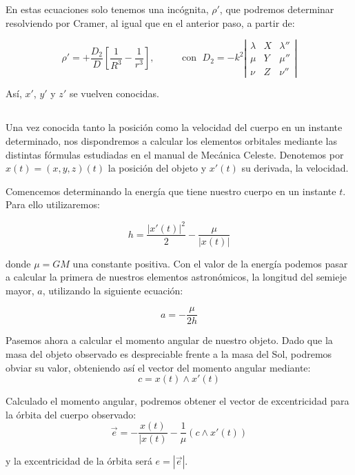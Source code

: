 \documentclass[11pt]{article}
\begin{document}
En estas ecuaciones solo tenemos una incógnita, $\rho'$, que podremos determinar resolviendo por Cramer, al igual que en el anterior paso, a partir de:

\[
\rho'=+\frac{D_2}{D}[\frac{1}{R^3}-\frac{1}{r^3}],
\; \; \; \; \; \; \; \; \; \text{ con } \;
D_2 = -k^2
\left|
\begin{array}{ccc}
\lambda & X & \lambda''\\
\mu & Y & \mu''\\
\nu & Z & \nu''
\end{array}
\right|
\]


Así, $x'$, $y'$ y $z'$ se vuelven conocidas.\\

\subsection{}
Una vez conocida tanto la posición como la velocidad del cuerpo en un instante determinado, nos dispondremos a calcular los elementos orbitales mediante las distintas fórmulas estudiadas en el manual de Mecánica Celeste\cite{ortega}. Denotemos por $x(t)=(x,y,z)(t)$ la posición del objeto y $x'(t)$ su derivada, la velocidad.

Comencemos determinando la energía que tiene nuestro cuerpo en un instante $t$. Para ello utilizaremos:

\[
h=\frac{|x'(t)|^2}{2}-\frac{\mu}{|x(t)|}
\]

\noindent donde $\mu=GM$ una constante positiva. Con el valor de la energía podemos pasar a calcular la primera de nuestros elementos astronómicos, la longitud del semieje mayor, $a$, utilizando la siguiente ecuación:

\[
a=-\frac{\mu}{2h}
\]

Pasemos ahora a calcular el momento angular de nuestro objeto. Dado que la masa del objeto observado es despreciable frente a la masa del Sol, podremos obviar su valor, obteniendo así el vector del momento angular mediante:
\[
c=x(t)\wedge x'(t)
\]

Calculado el momento angular, podremos obtener el vector de excentricidad para la órbita del cuerpo observado:
\[
\vec{e}=-\frac{x(t)}{|x(t)}-\frac{1}{\mu}(c\wedge x'(t))
\]

\noindent y la excentricidad de la órbita será $e=|\vec{e}|$.\\
\end{document}

